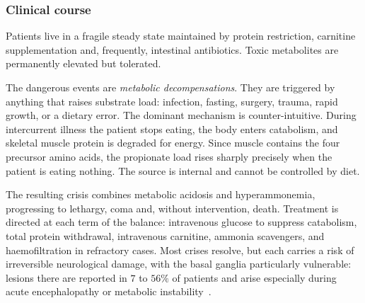 \subsubsection{Clinical course}

Patients live in a fragile steady state maintained by protein restriction, carnitine
supplementation and, frequently, intestinal antibiotics. Toxic metabolites are permanently
elevated but tolerated.

The dangerous events are \emph{metabolic decompensations}. They are triggered by anything
that raises substrate load: infection, fasting, surgery, trauma, rapid growth, or a
dietary error. The dominant mechanism is counter-intuitive. During intercurrent illness the
patient stops eating, the body enters catabolism, and skeletal muscle protein is degraded
for energy. Since muscle contains the four precursor amino acids, the propionate
load rises sharply precisely when the patient is eating nothing. The source is internal
and cannot be controlled by diet.

The resulting crisis combines metabolic acidosis and hyperammonemia, progressing to
lethargy, coma and, without intervention, death. Treatment is directed at each term of the
balance: intravenous glucose to suppress catabolism, total protein withdrawal, intravenous
carnitine, ammonia scavengers, and haemofiltration in refractory cases. Most crises
resolve, but each carries a risk of irreversible neurological damage, with the basal
ganglia particularly vulnerable: lesions there are reported in $7$ to $56\%$ of patients and
arise especially during acute encephalopathy or metabolic
instability~\cite{genereviews_pa}. %

